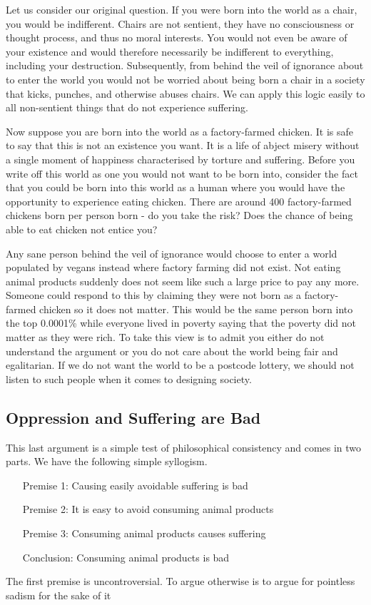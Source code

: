 Let us consider our original question. If you were born into the world as a chair, you would be indifferent. Chairs are not sentient, they have no consciousness or thought process, and thus no moral interests. You would not even be aware of your existence and would therefore necessarily be indifferent to everything, including your destruction. Subsequently, from behind the veil of ignorance about to enter the world you would not be worried about being born a chair in a society that kicks, punches, and otherwise abuses chairs. We can apply this logic easily to all non-sentient things that do not experience suffering.

Now suppose you are born into the world as a factory-farmed chicken. It is safe to say that this is not an existence you want. It is a life of abject misery without a single moment of happiness characterised by torture and suffering. Before you write off this world as one you would not want to be born into, consider the fact that you could be born into this world as a human where you would have the opportunity to experience eating chicken. There are around 400 factory-farmed chickens born per person born - do you take the risk? Does the chance of being able to eat chicken not entice you?

Any sane person behind the veil of ignorance would choose to enter a world populated by vegans instead where factory farming did not exist. Not eating animal products suddenly does not seem like such a large price to pay any more. Someone could respond to this by claiming they were not born as a factory-farmed chicken so it does not matter. This would be the same person born into the top 0.0001\% while everyone lived in poverty saying that the poverty did not matter as they were rich. To take this view is to admit you either do not understand the argument or you do not care about the world being fair and egalitarian. If we do not want the world to be a postcode lottery, we should not listen to such people when it comes to designing society.

\subsection{Oppression and Suffering are Bad}

This last argument is a simple test of philosophical consistency and comes in two parts. We have the following simple syllogism.

\begin{itemize}[leftmargin=25mm]
    \item[Premise 1:] Causing easily avoidable suffering is bad
    \item[Premise 2:] It is easy to avoid consuming animal products
    \item[Premise 3:] Consuming animal products causes suffering
    \item[Conclusion:] Consuming animal products is bad
\end{itemize}

The first premise is uncontroversial. To argue otherwise is to argue for pointless sadism for the sake of it